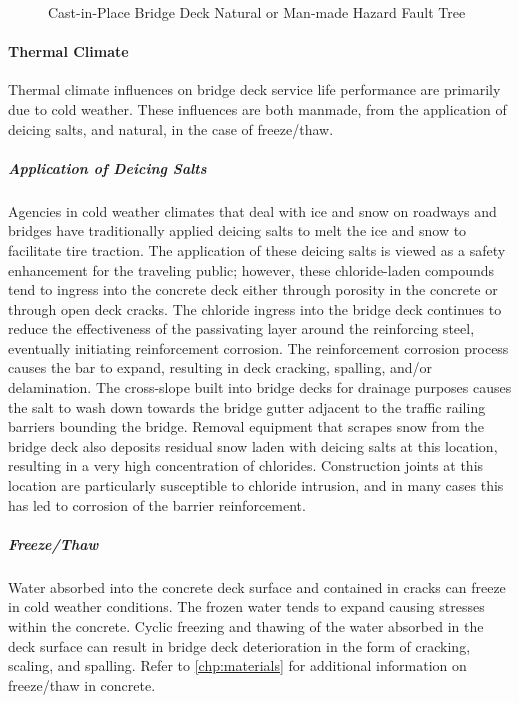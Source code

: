 \begin{figure}
  \caption{Cast-in-Place Bridge Deck Natural or Man-made Hazard Fault Tree}
  \label{fig:fault-tree-cip-deck-hazard}
\end{figure}

\paragraph{Thermal Climate}
Thermal climate influences on bridge deck service life performance are primarily due to cold weather. These influences are both manmade, from the application of deicing salts, and natural, in the case of freeze/thaw.

\subparagraph*{Application of Deicing Salts}
Agencies in cold weather climates that deal with ice and snow on roadways and bridges have traditionally applied deicing salts to melt the ice and snow to facilitate tire traction. The application of these deicing salts is viewed as a safety enhancement for the traveling public; however, these chloride-laden compounds tend to ingress into the concrete deck either through porosity in the concrete or through open deck cracks. The chloride ingress into the bridge deck continues to reduce the effectiveness of the passivating layer around the reinforcing steel, eventually initiating reinforcement corrosion. The reinforcement corrosion process causes the bar to expand, resulting in deck cracking, spalling, and/or delamination. The cross-slope built into bridge decks for drainage purposes causes the salt to wash down towards the bridge gutter adjacent to the traffic railing barriers bounding the bridge. Removal equipment that scrapes snow from the bridge deck also deposits residual snow laden with deicing salts at this location, resulting in a very high concentration of chlorides. Construction joints at this location are particularly susceptible to chloride intrusion, and in many cases this has led to corrosion of the barrier reinforcement.

\subparagraph*{Freeze/Thaw}
Water absorbed into the concrete deck surface and contained in cracks can freeze in cold weather conditions. The frozen water tends to expand causing stresses within the concrete. Cyclic freezing and thawing of the water absorbed in the deck surface can result in bridge deck deterioration in the form of cracking, scaling, and spalling. Refer to \cref{chp:materials} for additional information on freeze/thaw in concrete.


